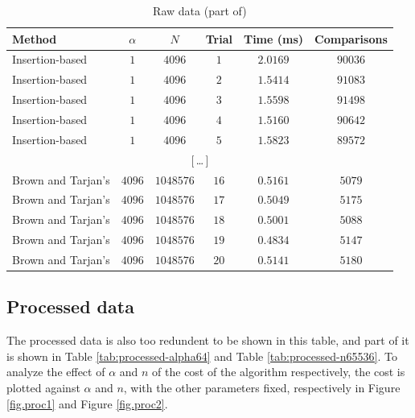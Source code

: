 \documentclass[12pt]{article}
\begin{document}
\begin{table}[h!]
\centering
\caption{Raw data (part of)}
\label{tab.raw}
\begin{tabular}{l c c c c c}
\hline
\textbf{Method} & $\alpha$ & $N$ & \textbf{Trial} & \textbf{Time (ms)} & \textbf{Comparisons} \\
\hline
Insertion-based & $1$ & $4096$ & $1$ & $2.0169$ & $90036$ \\
Insertion-based & $1$ & $4096$ & $2$ & $1.5414$ & $91083$ \\
Insertion-based & $1$ & $4096$ & $3$ & $1.5598$ & $91498$ \\
Insertion-based & $1$ & $4096$ & $4$ & $1.5160$ & $90642$ \\
Insertion-based & $1$ & $4096$ & $5$ & $1.5823$ & $89572$ \\
\multicolumn{6}{c}{[\,\dots\,]} \\
Brown and Tarjan's & $4096$ & $1048576$ & $16$ & $0.5161$ & $5079$ \\
Brown and Tarjan's & $4096$ & $1048576$ & $17$ & $0.5049$ & $5175$ \\
Brown and Tarjan's & $4096$ & $1048576$ & $18$ & $0.5001$ & $5088$ \\
Brown and Tarjan's & $4096$ & $1048576$ & $19$ & $0.4834$ & $5147$ \\
Brown and Tarjan's & $4096$ & $1048576$ & $20$ & $0.5141$ & $5180$ \\
\hline
\end{tabular}
\end{table}

\subsection{Processed data}

The processed data is also too redundent to be shown in this table, and part of it is shown in Table \ref{tab:processed-alpha64} and Table \ref{tab:processed-n65536}. To analyze the effect of $\alpha$ and $n$ of the cost of the algorithm respectively, the cost is plotted against $\alpha$ and $n$, with the other parameters fixed, respectively in Figure \ref{fig.proc1} and Figure \ref{fig.proc2}.
\end{document}

